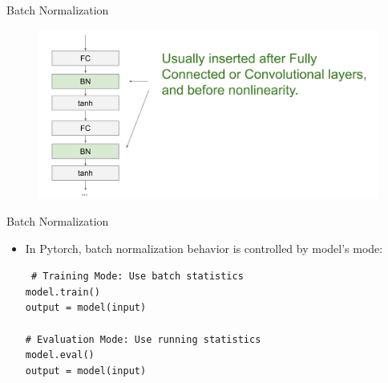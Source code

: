 \begin{frame}{Batch Normalization}
\begin{figure}
\centering
\includegraphics[width=1.0\textwidth,height=0.9\textheight,keepaspectratio]{images/bn4.png}
\end{figure}
\end{frame}

\begin{frame}{Batch Normalization}
    \begin{itemize}
        \item In Pytorch, batch normalization behavior is controlled by model's mode:
            \begin{block}{}
        \texttt{\small
        \# Training Mode: Use batch statistics\\
        model.train() \\
        output = model(input) \\
        \\
        \# Evaluation Mode: Use running statistics\\
        model.eval() \\
         output = model(input)
        }
    \end{block}
    \end{itemize}
\end{frame}

